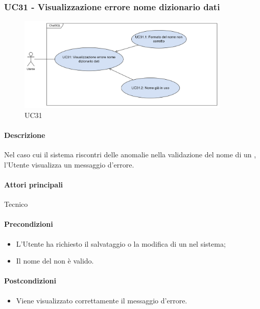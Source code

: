 \subsubsection{UC31 - Visualizzazione errore nome dizionario dati}\label{UC31}

\begin{figure}[H]
  \centering
  \includegraphics[width=0.90\textwidth]{assets/uc31.png}
  \caption{UC31}
\end{figure}

\paragraph*{Descrizione}
Nel caso cui il sistema riscontri delle anomalie nella validazione del nome di un , l'Utente visualizza un messaggio d'errore.

\paragraph*{Attori principali}
Tecnico

\paragraph*{Precondizioni}
\begin{itemize}
  \item L'Utente ha richiesto il salvataggio o la modifica di un  nel sistema;
  \item Il nome del  non è valido.
\end{itemize}

\paragraph*{Postcondizioni}
\begin{itemize}
  \item Viene visualizzato correttamente il messaggio d'errore.
\end{itemize}

